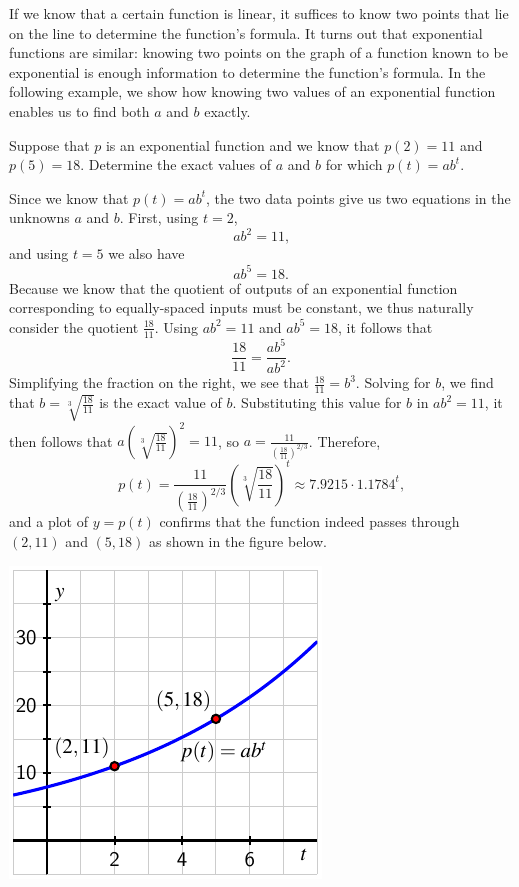 \documentclass[nooutcomes]{ximera}
\begin{document}
If we know that a certain function is linear, it suffices to know two points that lie on the line to determine the function's formula.  It turns out that exponential functions are similar:  knowing two points on the graph of a function known to be exponential is enough information to determine the function's formula.  In the following example, we show how knowing two values of an exponential function enables us to find both $a$ and $b$ exactly.

\begin{example}\label{example:exp1}
Suppose that $p$ is an exponential function and we know that $p(2) = 11$ and $p(5) = 18$.  Determine the exact values of $a$ and $b$ for which $p(t) = ab^t$.
\begin{explanation}
Since we know that $p(t) = ab^t$, the two data points give us two equations in the unknowns $a$ and $b$.  First, using $t = 2$,%
\begin{equation}
ab^2 = 11\text{,}
\end{equation}
and using $t = 5$ we also have%
\begin{equation}
ab^5 = 18\text{.}
\end{equation}
Because we know that the quotient of outputs of an exponential function corresponding to equally-spaced inputs must be constant, we thus naturally consider the quotient $\frac{18}{11}$.  Using $ab^2 = 11$ and $ab^5 = 18$, it follows that%
\begin{equation*}
\frac{18}{11} = \frac{ab^5}{ab^2}\text{.}
\end{equation*}
Simplifying the fraction on the right, we see that $\frac{18}{11} = b^3$. Solving for $b$, we find that $b = \sqrt[3]{\frac{18}{11}}$ is the exact value of $b$.  Substituting this value for $b$ in $ab^2 = 11$, it then follows that $a \left( \sqrt[3]{\frac{18}{11}} \right)^2 = 11$, so $a = \frac{11}{\left( \frac{18}{11} \right)^{2/3}}$.  Therefore,%
\begin{equation*}
p(t) = \frac{11}{\left( \frac{18}{11} \right)^{2/3}} \left( \sqrt[3]{\frac{18}{11}} \right)^t \approx 7.9215 \cdot 1.1784^t\text{,}
\end{equation*}
and a plot of $y = p(t)$ confirms that the function indeed passes through $(2,11)$ and $(5,18)$ as shown in the figure below.

\begin{image}
\includegraphics{growth-find-a-b.pdf}
\end{image}


\end{explanation}
\end{example}
\end{document}
